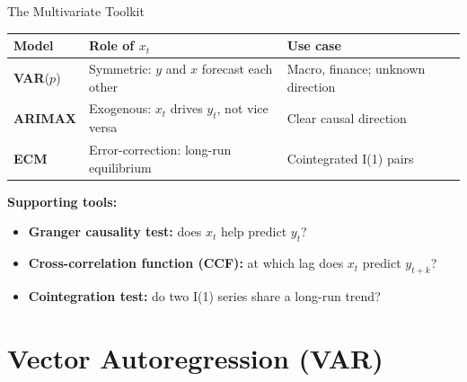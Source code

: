 \documentclass[aspectratio=169, 11pt]{beamer}
\begin{document}
\begin{frame}{The Multivariate Toolkit}
  \begin{center}
    {\small
    \begin{tabular}{lll}
      \toprule
      \textbf{Model} & \textbf{Role of $x_t$} & \textbf{Use case} \\
      \midrule
      \textbf{VAR}($p$)   & Symmetric: $y$ and $x$ forecast each other
                           & Macro, finance; unknown direction \\
      \textbf{ARIMAX}     & Exogenous: $x_t$ drives $y_t$, not vice versa
                           & Clear causal direction \\
      \textbf{ECM}        & Error-correction: long-run equilibrium
                           & Cointegrated I(1) pairs \\
      \bottomrule
    \end{tabular}
    }
  \end{center}
  \vspace{0.1cm}
  \textbf{Supporting tools:}
  \begin{itemize}\small
    \item \textbf{Granger causality test:} does $x_t$ help predict $y_t$?
    \item \textbf{Cross-correlation function (CCF):} at which lag does
          $x_t$ predict $y_{t+k}$?
    \item \textbf{Cointegration test:} do two I(1) series share a
          long-run trend?
  \end{itemize}
\end{frame}

\section{Vector Autoregression (VAR)}

\end{document}

